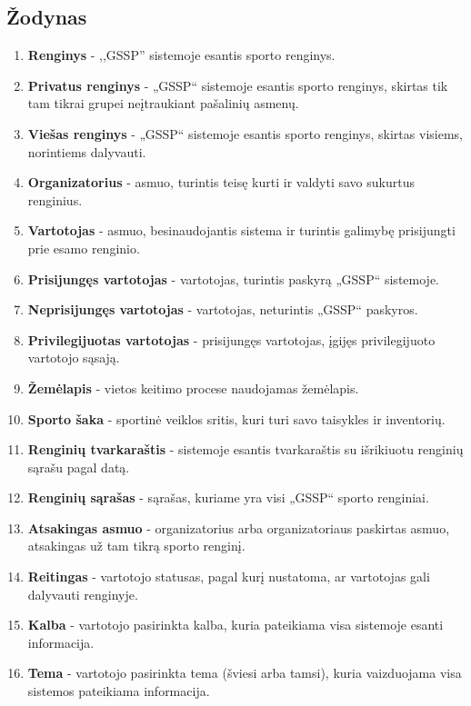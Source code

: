 \documentclass{VUMIFPSkursinis}
\begin{document}
        \subsection*{Žodynas} \label{strukturinisDSModelis_zodynas}
            \begin{enumerate}[label=\textbf{E\arabic*.}]
                \item \textbf{Renginys} - ,,GSSP'' sistemoje esantis sporto renginys.
				\item \textbf{Privatus renginys} - „GSSP“ sistemoje esantis sporto renginys, skirtas tik tam tikrai grupei neįtraukiant pašalinių asmenų.
				\item \textbf{Viešas renginys} - „GSSP“ sistemoje esantis sporto renginys, skirtas visiems, norintiems dalyvauti.
                \item \textbf{Organizatorius} - asmuo, turintis teisę kurti ir valdyti savo sukurtus renginius.
                \item \textbf{Vartotojas} - asmuo, besinaudojantis sistema ir turintis galimybę prisijungti prie esamo renginio.
				\item \textbf{Prisijungęs vartotojas} - vartotojas, turintis paskyrą „GSSP“ sistemoje.
				\item \textbf{Neprisijungęs vartotojas} - vartotojas, neturintis „GSSP“ paskyros.
				\item \textbf{Privilegijuotas vartotojas} - prisijungęs vartotojas, įgijęs privilegijuoto vartotojo sąsają.
                \item \textbf{Žemėlapis} - vietos keitimo procese naudojamas žemėlapis.
				\item \textbf{Sporto šaka} - sportinė veiklos sritis, kuri turi savo taisykles ir inventorių.
				\item \textbf{Renginių tvarkaraštis} - sistemoje esantis tvarkaraštis su išrikiuotu renginių sąrašu pagal datą.
				\item \textbf{Renginių sąrašas} - sąrašas, kuriame yra visi „GSSP“ sporto renginiai.
				\item \textbf{Atsakingas asmuo} - organizatorius arba organizatoriaus paskirtas asmuo, atsakingas už tam tikrą sporto renginį.
				\item \textbf{Reitingas} - vartotojo statusas, pagal kurį nustatoma, ar vartotojas gali dalyvauti renginyje.
				\item \textbf{Kalba} - vartotojo pasirinkta kalba, kuria pateikiama visa sistemoje esanti informacija.
				\item \textbf{Tema} - vartotojo pasirinkta tema (šviesi arba tamsi), kuria vaizduojama visa sistemos pateikiama informacija.

\end{enumerate}
\end{document}
